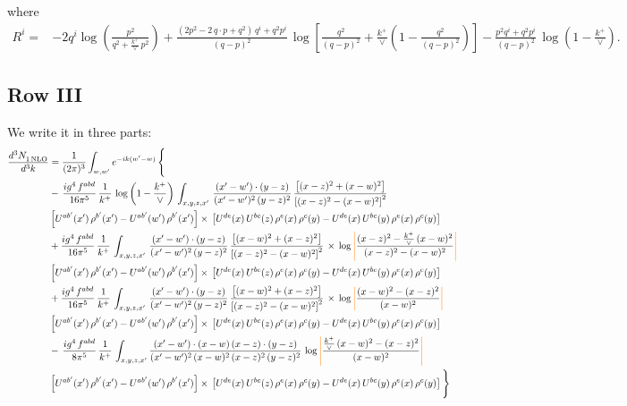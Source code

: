 \documentclass[9pt]{article}
\numberwithin{equation}{section}
\begin{document}
where
\begin{align}
R^{i} =& -2q^{i}\log\left(\frac{p^{2}}{q^{2}+\frac{k^{+}}{\vee}\,p^{2}}\right)
+\frac{(2p^{2}-2\,q\cdot p+q^{2})\,q^{i}+q^{2}p^{i}}{(q-p)^{2}}\,
\log\left[\frac{q^{2}}{(q-p)^{2}}+\frac{k^{+}}{\vee}\left(1-\frac{q^{2}}{(q-p)^{2}}\right)\right]
-\frac{p^{2}q^{i}+q^{2}p^{i}}{(q-p)^{2}}\,\log\left(1-\frac{k^{+}}{\vee}\right).
\end{align}
\subsection{Row III}
We write it in three parts:
\begin{align}
   \frac{d^{3}N_{1\,\rm NLO}^{\rm}}{d^{3}k}  & =  \frac{1}{(2\pi)^{3}}  \int_{w, w^\prime} e^{-ik(w^\prime-w)}\, \Bigg\{\notag \\
& -\,\frac{ig^{4}\,f^{abd}}{16\pi^{5}}\,\frac{1}{k^{+}}\,\log{\left(1-\frac{k^{+}}{\vee}\right)}\,\int_{x,y,z,x'}\, \frac{(x'-w')\cdot (y-z)}{(x'-w')^{2}\,(y-z)^{2}}\,\frac{\left[(x-z)^{2}+(x-w)^{2}\right]}{\left[(x-z)^{2}-(x-w)^{2}\right]^{2}}\notag \\ & \left[U^{ab'}(x')\,\rho^{b'}(x')-U^{ab'}(w')\, \rho^{b'}(x')\right]\times\, \left[U^{de}(x)\,U^{bc}(z)\, \rho^{e}(x)\,\rho^{c}(y)-U^{de}(x)\,U^{bc}(y)\,\rho^{e}(x)\,\rho^{c}(y)\right] \notag \\
&  +\frac{ig^{4}\,f^{abd}}{16\pi^{5}}\, \frac{1}{k^{+}}\,\int_{x,y,z,x'}\, \frac{(x'-w')\cdot (y-z)}{(x'-w')^{2}\,(y-z)^{2}}\, \frac{\left[(x-w)^{2}+(x-z)^{2}\right]}{\left[(x-z)^{2}-(x-w)^{2}\right]^{2}}\, \times\, \log{\textcolor{orange}{\left|\textcolor{black}{\frac{(x-z)^{2}-\frac{k^{+}}{\vee}\,(x-w)^{2}}{(x-z)^{2}-(x-w)^{2}}}\right|}}\notag \\ & \left[U^{ab'}(x')\,\rho^{b'}(x')-U^{ab'}(w')\, \rho^{b'}(x')\right]\times\, \left[U^{de}(x)\,U^{bc}(z)\, \rho^{e}(x)\,\rho^{c}(y)-U^{de}(x)\,U^{bc}(y)\,\rho^{e}(x)\,\rho^{c}(y)\right] \notag \\
&  +\frac{ig^{4}\,f^{abd}}{16\pi^{5}}\, \frac{1}{k^{+}}\,\int_{x,y,z,x'}\, \frac{(x'-w')\cdot (y-z)}{(x'-w')^{2}\,(y-z)^{2}}\, \frac{\left[(x-w)^{2}+(x-z)^{2}\right]}{\left[(x-z)^{2}-(x-w)^{2}\right]^{2}}\, \times\, \log{\textcolor{orange}{\left|\textcolor{black}{\frac{(x-w)^{2}-(x-z)^{2}}{(x-w)^{2}}}\right|}}\notag \\ & \left[U^{ab'}(x')\,\rho^{b'}(x')-U^{ab'}(w')\, \rho^{b'}(x')\right]\times\, \left[U^{de}(x)\,U^{bc}(z)\, \rho^{e}(x)\,\rho^{c}(y)-U^{de}(x)\,U^{bc}(y)\,\rho^{e}(x)\,\rho^{c}(y)\right] \notag \\
&-\, \frac{ig^{4}\,f^{abd}}{8\pi^{5}}\,\frac{1}{k^{+}}\,\int_{x,y,z,x'}\frac{(x'-w')\cdot (x-w)\, (x-z)\cdot (y-z)}{(x'-w')^{2}\, (x-w)^{2}\, (x-z)^{2}\, (y-z)^{2}}\,\log{\textcolor{orange}{\left|\textcolor{black}{\frac{\frac{k^{+}}{\vee}\,(x-w)^{2}-(x-z)^{2}}{(x-w)^{2}}}\right|}} \notag \\ & \left[U^{ab'}(x')\,\rho^{b'}(x')-U^{ab'}(w')\, \rho^{b'}(x')\right]\times\, \left[U^{de}(x)\,U^{bc}(z)\, \rho^{e}(x)\,\rho^{c}(y)-U^{de}(x)\,U^{bc}(y)\,\rho^{e}(x)\,\rho^{c}(y)\right]\Bigg\}
\end{align}
\end{document}
